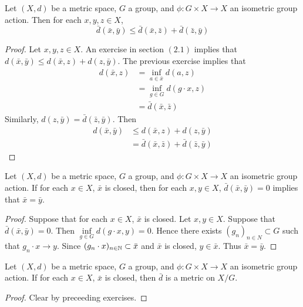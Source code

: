 \documentclass{book}
\begin{document}
	\begin{ex} \lex{}
	Let $(X, d)$ be a metric space, $G$ a group, and $\phi: G \times X \rightarrow X$ an isometric group action. Then for each $x, y, z \in X$, $$\bar{d}(\bar{x}, \bar{y}) \leq \bar{d}(\bar{x}, \bar{z}) + \bar{d}(\bar{z}, \bar{y})$$
	\end{ex}
	
	\begin{proof}
	Let $x, y, z \in X$. An exercise in section $(2.1)$ implies that $d(\bar{x}, \bar{y}) \leq d(\bar{x}, z) + d(z, \bar{y})$. The previous exercise implies that 
	\begin{align*}
	d(\bar{x}, z) 
	&= \inf_{a \in \bar{x}} d(a, z) \\
	&= \inf_{g \in G} d(g \cdot x, z) \\
	&= \bar{d}(\bar{x}, \bar{z})
	\end{align*}
	Similarly, $d(z, \bar{y}) = \bar{d}(\bar{z}, \bar{y})$. Then 
	\begin{align*}
	d(\bar{x}, \bar{y}) 
	&\leq d(\bar{x}, z) + d(z, \bar{y}) \\
	&= \bar{d}(\bar{x}, \bar{z}) + \bar{d}(\bar{z}, \bar{y})
	\end{align*}
	\end{proof}
	
	\begin{ex} \lex{}
	Let $(X, d)$ be a metric space, $G$ a group, and $\phi: G \times X \rightarrow X$ an isometric group action. If for each $x \in X$, $\bar{x}$ is closed, then for each $x, y \in X$, $\bar{d}(\bar{x}, \bar{y}) =0$ implies that $\bar{x} = \bar{y}$.
	\end{ex}
	
	\begin{proof}
	Suppose that for each $x \in X$, $\bar{x}$ is closed. Let $x,y \in X$. Suppose that $\bar{d}(\bar{x} , \bar{y}) = 0$. Then $\inf\limits_{ g \in G} d(g \cdot x, y) = 0$. Hence there exists $(g_n)_{n \in N} \subset G$ such that $g_n \cdot x \rightarrow y$. Since $(g_n \cdot x)_{n \in \mathbb{N}} \subset \bar{x}$ and $\bar{x}$ is closed, $y \in \bar{x}$. Thus $\bar{x} = \bar{y}$. 
	\end{proof}
	
	\begin{ex} \lex{}
	Let $(X, d)$ be a metric space, $G$ a group, and $\phi: G \times X \rightarrow X$ an isometric group action. If for each $x \in X$, $\bar{x}$ is closed, then $\bar{d}$ is a metric on $X/G$.
	\end{ex}
	
	\begin{proof}
	Clear by preceeding exercises.
	\end{proof}
	
\end{document}
